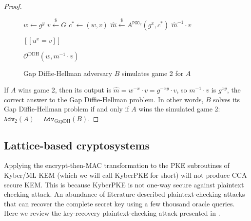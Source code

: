 \documentclass[runningheads]{llncs}
\newcommand{\pco}{\texttt{PCO}}
\newcommand{\leftsample}{\stackrel{\$}{\leftarrow}}
\newcommand{\llbrack}{[\![}
\newcommand{\rrbrack}{]\!]}
\newcommand{\adv}{\texttt{Adv}}
\begin{document}
\begin{proof}
\begin{figure}[h]
        \begin{minipage}[t]{0.45\textwidth}
            \begin{algorithm}[H]
                \caption*{$B^{\mathcal{O}^\text{DDH}}(g, g^x, g^y)$}
                \begin{algorithmic}[1]
                    \State $w \leftarrow g^y$
                    \State $v \leftsample G$
                    \State $c^\ast \leftarrow (w, v)$
                    \State $\hat{m} \leftsample A^{\pco_2}(g^x, c^\ast)$
                    \State \Return $\hat{m}^{-1}\cdot v$
                \end{algorithmic}
            \end{algorithm}
        \end{minipage}
        \begin{minipage}[t]{0.45\textwidth}
            \begin{algorithm}[H]
                \caption*{$\mathcal{O}^\text{DDH}(u, v)$}
                \begin{algorithmic}[1]
                    \State \Return $\llbrack u^x = v \rrbrack$
                \end{algorithmic}
            \end{algorithm}\vspace{-0.3cm}
            \begin{algorithm}[H]
                \caption*{$\pco_2(m, c=(w, v))$}
                \begin{algorithmic}[1]
                    \State \Return $\mathcal{O}^\text{DDH}(w, m^{-1}\cdot v)$
                \end{algorithmic}
            \end{algorithm}
        \end{minipage}

        \caption{Gap Diffie-Hellman adversary $B$ simulates game 2 for $A$}\label{fig:ow-pca-to-gap-dh}
    \end{figure}

    If $A$ wins game 2, then its output is $\hat{m} = w^{-x}\cdot v = g^{-xy}\cdot v$, so $m^{-1}\cdot v$ is $g^{xy}$, the correct answer to the Gap Diffie-Hellman problem. In other words, $B$ solves its Gap Diffie-Hellman problem if and only if $A$ wins the simulated game 2: $\adv_2(A) = \adv_\text{GapDH}(B)$.
\end{proof}

\subsection{Lattice-based cryptosystems}
Applying the encrypt-then-MAC transformation to the PKE subroutines of Kyber/ML-KEM (which we will call KyberPKE for short) will not produce CCA secure KEM. This is because KyberPKE is not one-way secure against plaintext checking attack. An abundance of literature \cite{DBLP:journals/tches/UenoXTITH22,DBLP:journals/tches/TanakaUXITH23,DBLP:conf/acns/Huguenin-Dumittan20} described plaintext-checking attacks that can recover the complete secret key using a few thousand oracle queries. Here we review the key-recovery plaintext-checking attack presented in \cite{DBLP:conf/acns/Huguenin-Dumittan20}.
\end{document}
